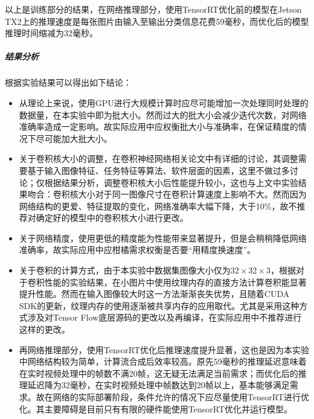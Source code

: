 \par 以上是训练部分的结果，在网络推理部分，使用TensorRT优化前的模型在Jetson TX2上的推理速度是每张图片由输入至输出分类信息花费59毫秒，而优化后的模型推理时间缩减为32毫秒。
\subparagraph{结果分析}
\par 根据实验结果可以得出如下结论：
\begin{itemize}
	\item 从理论上来说，使用GPU进行大规模计算时应尽可能增加一次处理同时处理的数据量，在本实验中即为批大小。然而过大的批大小会减少迭代次数，对网络准确率造成一定影响。故实际应用中应权衡批大小与准确率，在保证精度的情况下尽可能加大批大小。
	\item 关于卷积核大小的调整，在卷积神经网络相关论文中有详细的讨论，其调整需要基于输入图像特征、任务特征等算法、软件层面的因素，这里不做过多讨论；仅根据结果分析，调整卷积核大小后性能提升较小，这也与上文中实验结果吻合：卷积核大小对于同一图像尺寸在卷积计算速度上影响不大。然而因为网络结构的更爱、特征提取的变化，网络准确率大幅下降，大于10\%，故不推荐对确定好的模型中的卷积核大小进行更改。
	\item 关于网络精度，使用更低的精度能为性能带来显著提升，但是会稍稍降低网络准确率，故实际应用中应柑橘需求权衡是否要“用精度换速度”。
	\item 关于卷积的计算方式，由于本实验中数据集图像大小仅为$ 32\times 32\times 3 $，根据对于卷积性能的实验结果，在小图片中使用纹理内存的直接方法计算卷积能显著提升性能。然而在输入图像较大时这一方法渐渐丧失优势，且随着CUDA SDK的更新，纹理内存的使用逐渐被共享内存的应用取代。尤其是采用这种方式涉及对Tensor Flow底层源码的更改以及再编译，在实际应用中不推荐进行这样的更改。
	\item 再网络推理部分，使用TensorRT优化后推理速度提升显著，这也是因为本实验中网络结构较为简单，计算流合成后效率较高。原先59毫秒的推理延迟意味着在实时视频处理中的帧数不满20帧，这无疑无法满足当前需求；而优化后的推理延迟降为32毫秒，在实时视频处理中帧数达到20帧以上，基本能够满足需求。故在网络的实际部署阶段，条件允许的情况下应尽量使用TensorRT进行优化。其主要障碍是目前只有有限的硬件能使用TensorRT优化并运行模型。
\end{itemize}